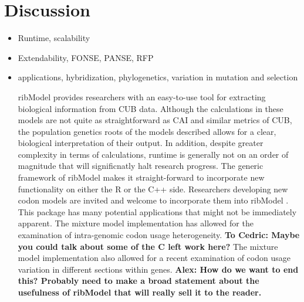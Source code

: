 \documentclass{bioinfo}
\newcommand{\package}{ribModel } %
\begin{document}
\section*{Discussion}
\begin{itemize}
\item Runtime, scalability
\item Extendability, FONSE, PANSE, RFP
\item applications, hybridization, phylogenetics, variation in mutation and selection

\package provides researchers with an easy-to-use tool for extracting biological information from CUB data. Although the calculations in these models are not quite as straightforward as CAI and similar metrics of CUB, the population genetics roots of the models described allows for a clear, biological interpretation of their output. In addition, despite greater complexity in terms of calculations, runtime is generally not on an order of magnitude that will significnatly halt research progress.
The generic framework of \package makes it straight-forward to incorporate new functionality on either the R or the C++ side. Researchers developing new codon models are invited and welcome to incorporate them into \package.   
This package has many potential applications that might not be immediately apparent. The mixture model implementation has allowed for the examination of intra-genomic codon usage heterogeneity. \textbf{To Cedric: Maybe you could talk about some of the C left work here?} The mixture model implementation also allowed for a recent examination of codon usage variation in different sections within genes. 
\textbf{Alex: How do we want to end this? Probably need to make a broad statement about the usefulness of \package that will really sell it to the reader.} 


\end{itemize}



%
%
\end{document}
